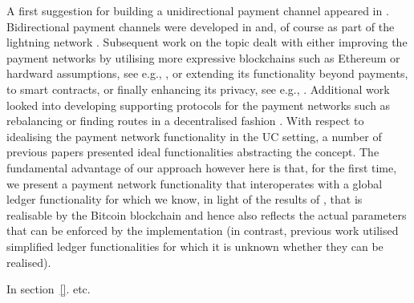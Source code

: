  A first suggestion for building 
a unidirectional payment channel
appeared in \cite{spilman}. Bidirectional payment channels were developed in 
\cite{DBLP:conf/sss/DeckerW15} and, of course as part of the lightning network  \cite{lightning}. Subsequent work on the topic 
dealt  with either improving the payment networks  by utilising more 
expressive blockchains such as Ethereum \cite{perun} or  hardward assumptions, see e.g., \cite{DBLP:conf/systor/LindNEKPS18}, 
or extending its functionality beyond payments, to smart contracts, 
\cite{sprites} or finally  enhancing its privacy, see e.g., 
\cite{Malavolta:2017:CPP:3133956.3134096,DBLP:conf/ccs/0001M17,DBLP:conf/ndss/HeilmanABSG17}. Additional work looked into developing supporting protocols
for the payment networks such as rebalancing 
\cite{DBLP:conf/ccs/KhalilG17} or finding routes in a decentralised fashion
\cite{flare}. 
With respect to idealising the payment network functionality in the UC setting, 
a number of previous papers \cite{Malavolta:2017:CPP:3133956.3134096,sprites,perun} presented
ideal functionalities abstracting the concept. The fundamental advantage of our approach however
here is  that, for the first time, we present a payment network functionality
that interoperates with a global ledger functionality for which we
know, in light of the results of \cite{BMTZ17}, 
that is realisable by the Bitcoin blockchain
and hence also reflects the actual parameters that can be enforced by the implementation 
(in contrast, previous work utilised simplified ledger functionalities for which it is unknown whether they can be realised). 

 In section~\ref{}. etc. 


